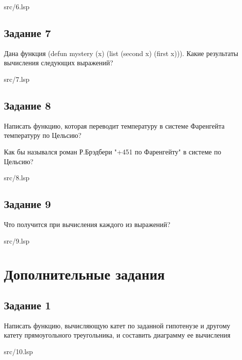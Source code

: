 \FloatBarrier
\begin{lstinputlisting}[style={lsp}]{src/6.lsp}
\end{lstinputlisting}
\FloatBarrier

\section*{Задание 7}
Дана функция (defun mystery (x) (list (second x) (first x))).
Какие результаты вычисления следующих выражений? 

\FloatBarrier
\begin{lstinputlisting}[style={lsp}]{src/7.lsp}
\end{lstinputlisting}
\FloatBarrier


\section*{Задание 8}
Написать функцию, которая переводит температуру в системе Фаренгейта
температуру по Цельсию?

Как бы назывался роман Р.Брэдбери "+451 по Фаренгейту" в системе по Цельсию?

\FloatBarrier
\begin{lstinputlisting}[style={lsp}]{src/8.lsp}
\end{lstinputlisting}
\FloatBarrier

\section*{Задание 9}
Что получится при вычисления каждого из выражений?

\FloatBarrier
\begin{lstinputlisting}[style={lsp}]{src/9.lsp}
\end{lstinputlisting}
\FloatBarrier

\chapter*{Дополнительные задания}

\section*{Задание 1}
Написать функцию, вычисляющую катет по заданной гипотенузе и другому катету
прямоугольного треугольника, и составить диаграмму ее вычисления

\FloatBarrier
\begin{lstinputlisting}[style={lsp}]{src/10.lsp}
\end{lstinputlisting}
\FloatBarrier


